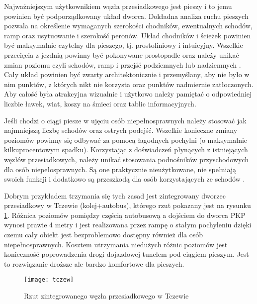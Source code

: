 \documentclass[twoside,12pt]{article}
\begin{document}
	Najważniejszym użytkownikiem węzła przesiadkowego jest pieszy i to jemu powinien być podporządkowany układ dworca. Dokładna analiza ruchu pieszych pozwala na określenie wymaganych szerokości chodników, ewentualnych schodów, ramp oraz usytuowanie i szerokość peronów. Układ chodników i ścieżek powinien być maksymalnie czytelny dla pieszego, tj. prostoliniowy i intuicyjny. Wszelkie przecięcia z jezdnią powinny być pokonywane prostopadle oraz należy unikać zmian poziomu czyli schodów, ramp i przejść podziemnych lub nadziemnych  \cite{zaluski}. Cały układ powinien być zwarty architektonicznie i przemyślany, aby nie było w nim punktów, z których nikt nie korzysta oraz punktów nadmiernie zatłoczonych. Aby całość była atrakcyjna wizualnie i użytkowo należy pamiętać o odpowiedniej liczbie ławek, wiat, koszy na śmieci oraz tablic informacyjnych. 
	
	Jeśli chodzi o ciągi piesze w ujęciu osób niepełnosprawnych należy stosować jak najmniejszą liczbę schodów oraz ostrych podejść. Wszelkie konieczne zmiany poziomów powinny się odbywać za pomocą łagodnych pochylni (o maksymalnie kilkuprocentowym spadku). Korzystając z doświadczeń płynących z istniejących węzłów przesiadkowych, należy unikać stosowania podnośników przyschodowych dla osób niepełosprawnych. Są one praktycznie nieużytkowane, nie spełniają swoich funkcji i dodatkowo są przeszkodą dla osób korzystających ze schodów \cite{zaluski}. 
	
	Dobrym przykładem trzymania się tych zasad jest zintegrowany dworzec przesiadkowy w Tczewie (kolej+autobus), którego rzut pokazany jest na rysunku \ref{tczew}. Różnica poziomów pomiędzy częścią autobusową a dojściem do dworca PKP wynosi prawie 4 metry i jest realizowana przez rampę o stałym pochyleniu dzięki czemu cały obiekt jest bezproblemowo dostępny również dla osób niepełnosprawnych. Kosztem utrzymania niedużych różnic poziomów jest konieczność poprowadzenia drogi dojazdowej tunelem pod ciągiem pieszym. Jest to rozwiązanie droższe ale bardzo komfortowe dla pieszych.
	
	\begin{figure}[H]
		\centering
		\texttt{[image: tczew]}\\
		\caption{Rzut zintegrowanego węzła przesiadkowego w Tczewie}
		\label{tczew}
	\end{figure}
	
\end{document}
